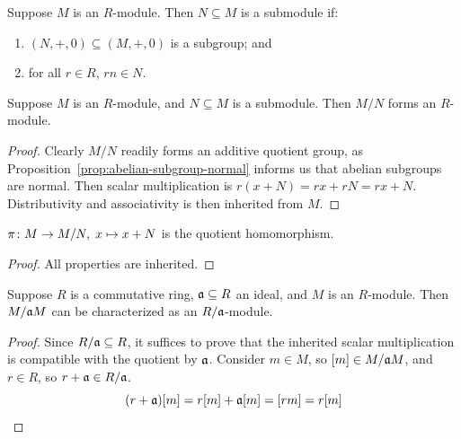 \begin{definition}
    Suppose \(M\) is an \(R\)-module.
    Then \(N \subseteq M\) is a submodule if:
    \begin{enumerate}[label={(\roman*)}, itemsep=0mm]
        \item \((N,+,0) \subseteq (M,+,0)\) is a subgroup; and
        \item for all \(r \in R\), \(rn \in N\).
    \end{enumerate}
\end{definition}
\begin{lemma}
    Suppose \(M\) is an \(R\)-module,
    and \(N \subseteq M\) is a submodule.
    Then \(M/N\) forms an \(R\)-module.
\end{lemma}
\begin{proof}
    Clearly \(M/N\) readily forms an additive quotient group,
    as Proposition~\ref{prop:abelian-subgroup-normal} informs us that abelian subgroups are normal.
    Then scalar multiplication is \(r(x+N) = rx + rN = rx + N\).
    Distributivity and associativity is then inherited from \(M\).
\end{proof}
\begin{corollary}
    \(\pi\colon M\to M/N,\;x\mapsto x+N\) is the quotient homomorphism.
\end{corollary}
\begin{proof}
    All properties are inherited.
\end{proof}
\begin{proposition}\label{prop:quotient-ring-module}
    Suppose \(R\) is a commutative ring, \(\mathfrak{a} \subseteq R\) an ideal,
    and \(M\) is an \(R\)-module.
    Then \(M/\mathfrak{a}M\) can be characterized as an \(R/\mathfrak{a}\)-module.
\end{proposition}
\begin{proof}
    Since \(R/\mathfrak{a} \subseteq R\),
    it suffices to prove that the inherited scalar multiplication
    is compatible with the quotient by \(\mathfrak{a}\).
    Consider \(m \in M\), so \([m] \in M/\mathfrak{a}M\),
    and \(r \in R\), so \(r+\mathfrak{a} \in R/\mathfrak{a}\).
    \begin{equation*}
        (r+\mathfrak{a})[m] = r[m] + \mathfrak{a}[m] = [rm] = r[m]
    \end{equation*}
\end{proof}

